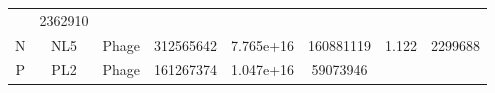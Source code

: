 \documentclass[]{article}
\begin{document}
\begin{longtable}[]{@{}cccccccc@{}}
\begin{minipage}[t]{0.08\columnwidth}
\strut\end{minipage} &
\begin{minipage}[t]{0.12\columnwidth}\centering\strut
2362910
\strut\end{minipage}\tabularnewline
\begin{minipage}[t]{0.07\columnwidth}\centering\strut
N
\strut\end{minipage} &
\begin{minipage}[t]{0.07\columnwidth}\centering\strut
NL5
\strut\end{minipage} &
\begin{minipage}[t]{0.11\columnwidth}\centering\strut
Phage
\strut\end{minipage} &
\begin{minipage}[t]{0.11\columnwidth}\centering\strut
312565642
\strut\end{minipage} &
\begin{minipage}[t]{0.11\columnwidth}\centering\strut
7.765e+16
\strut\end{minipage} &
\begin{minipage}[t]{0.11\columnwidth}\centering\strut
160881119
\strut\end{minipage} &
\begin{minipage}[t]{0.08\columnwidth}\centering\strut
1.122
\strut\end{minipage} &
\begin{minipage}[t]{0.12\columnwidth}\centering\strut
2299688
\strut\end{minipage}\tabularnewline
\begin{minipage}[t]{0.07\columnwidth}\centering\strut
P
\strut\end{minipage} &
\begin{minipage}[t]{0.07\columnwidth}\centering\strut
PL2
\strut\end{minipage} &
\begin{minipage}[t]{0.11\columnwidth}\centering\strut
Phage
\strut\end{minipage} &
\begin{minipage}[t]{0.11\columnwidth}\centering\strut
161267374
\strut\end{minipage} &
\begin{minipage}[t]{0.11\columnwidth}\centering\strut
1.047e+16
\strut\end{minipage} &
\begin{minipage}[t]{0.11\columnwidth}\centering\strut
59073946
\strut\end{minipage} &
\begin{minipage}[t]{0.08\columnwidth}\centering\strut

\end{minipage}
\end{longtable}
\end{document}
